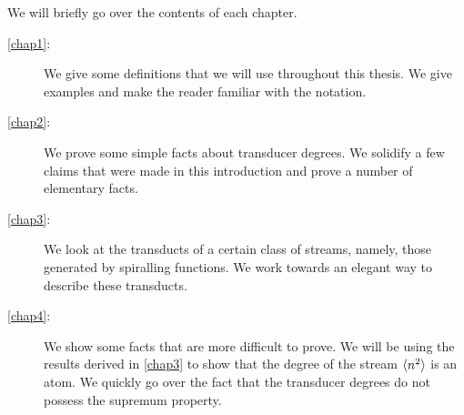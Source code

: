 We will briefly go over the contents of each chapter. 
\begin{description}
	\item[\cref{chap1}: ] We give some definitions that we will use throughout this thesis. We give examples and make the reader familiar with the notation.
	\item[\cref{chap2}: ] We prove some simple facts about transducer degrees. We solidify a few claims that were made in this introduction and prove a number of elementary facts.
	\item[\cref{chap3}: ] We look at the transducts of a certain class of streams, namely, those generated by spiralling functions. We work towards an elegant way to describe these transducts.
	\item[\cref{chap4}: ] We show some facts that are more difficult to prove. We will be using the results derived in \cref{chap3} to show that the degree of the stream $\langle n^2 \rangle$ is an atom. We quickly go over the fact that the transducer degrees do not possess the supremum property.
\end{description}